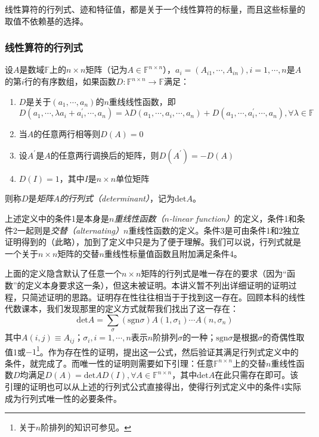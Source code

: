 \documentclass[main.tex]{subfiles}
\begin{document}
线性算符的行列式、迹和特征值，都是关于一个线性算符的标量，而且这些标量的取值不依赖基的选择。

\subsubsection{线性算符的行列式}
\begin{definition}\label{def:II.2.17}
    设$A$是数域$\mathbb{F}$上的$n\times n$矩阵（记为$A\in\mathbb{F}^{n\times n}$），$a_i=\left(A_{i1},\cdots,A_{in}\right),i=1,\cdots,n$是$A$的第$i$行的有序数组，如果函数$D:\mathbb{F}^{n\times n}\rightarrow\mathbb{F}$满足：
    \begin{enumerate}
        \item $D$是关于$\left(a_1,\cdots,a_n\right)$的$n$重线线性函数，即
              \[
                  D\left(a_1,\cdots,\lambda a_i+a^\prime_i,\cdots,a_n\right)=\lambda D\left(a_1,\cdots,a_i,\cdots,a_n\right)+D\left(a_1,\cdots,a^\prime_i,\cdots,a_n\right),\forall\lambda\in\mathbb{F}
              \]
        \item 当$A$的任意两行相等则$D\left(A\right)=0$
        \item 设$A^\prime$是$A$的任意两行调换后的矩阵，则$D\left(A^\prime\right)=-D\left(A\right)$
        \item $D\left(I\right)=1$，其中$I$是$n\times n$单位矩阵
    \end{enumerate}
    则称$D$是\emph{矩阵$A$的行列式（determinant）}，记为$\mathrm{det}A$。
\end{definition}
上述定义中的条件1是本身是\emph{$n$重线性函数（$n$-linear function）}的定义，条件1和条件2一起则是\emph{交替（alternating）}$n$重线性函数的定义。条件3是可由条件1和2独立证明得到的（此略\cite[\S 5.2]{Hoffman1971}），加到了定义中只是为了便于理解。我们可以说，行列式就是一个关于$n\times n$矩阵的交替$n$重线性标量值函数且附加满足条件4。

上面的定义隐含默认了任意一个$n\times n$矩阵的行列式是唯一存在的要求（因为“函数”的定义本身要求这一条），但这未被证明。本讲义暂不列出详细证明的证明过程，只简述证明的思路。证明存在性往往相当于于找到这一存在。回顾本科的线性代数课本，我们发现那里的定义方式\cite[\S 1.3 定义3.1]{周胜林2012线性代数}就帮我们找出了这一存在：
\[
    \mathrm{det}A=\sum_{\sigma}\left(\mathrm{sgn}\sigma\right)A\left(1,\sigma_1\right)\cdots A\left(n,\sigma_n\right)
\]
其中$A\left(i,j\right)\equiv A_{ij}$；$\sigma_i,i=1,\cdots,n$表示$n$阶排列$\sigma$的一种；$\mathrm{sgn}\sigma$是根据$\sigma$的奇偶性取值1或$-1$\footnote{关于$n$阶排列的知识可参见\cite[\S1.2]{周胜林2012线性代数}。}。作为存在性的证明，提出这一公式，然后验证其满足行列式定义中的条件，就完成了。而唯一性的证明则需要如下引理：任意$\mathbb{F}^{n\times n}$上的交替$n$重线性函数$D$均满足$D\left(A\right)=\mathrm{det}AD\left(I\right),\forall A\in\mathbb{F}^{n\times n}$，其中$\mathrm{det}A$在此只需存在即可。该引理的证明也可以从上述的行列式公式直接得出，使得行列式定义中的条件4实际成为行列式唯一性的必要条件。
\end{document}
